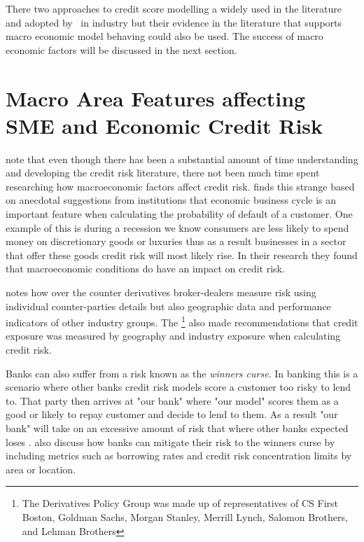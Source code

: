 There two approaches to credit score modelling a widely used in the literature and adopted by \subjectname\ in industry but their evidence in the literature that supports macro economic model behaving could also be used. The success of macro economic factors will be discussed in the next section.

\section{Macro Area Features affecting SME and Economic Credit Risk}
\cite{hackbarth_capital_2006} note that even though there has been a substantial amount of time  understanding and developing the credit risk literature, there not been much time spent researching how macroeconomic factors affect credit risk.  \cite{hackbarth_capital_2006} finds this strange based on anecdotal suggestions from institutions that economic business cycle is an important feature when calculating the probability of default of a customer. One example of this is during a recession we know consumers are less likely to spend money on discretionary goods or luxuries thus as a result businesses in a sector that offer these goods credit risk will most likely rise. In their research they found that macroeconomic conditions do have an impact on credit risk.

\cite{fama_term_1986} notes how over the counter derivatives broker-dealers measure risk using individual counter-parties details but also geographic data and performance indicators of other industry groups. The \cite{derivatives_policy_group_framework_1995} \footnote{The Derivatives Policy Group was made up of representatives of CS First Boston, Goldman Sachs, Morgan Stanley, Merrill Lynch, Salomon Brothers, and Lehman Brothers} also made recommendations that credit exposure was measured by geography and industry exposure when calculating credit risk.

Banks can also suffer from a risk known as the \textit{winners curse}. In banking this is a scenario where other banks credit risk models score a customer too risky to lend to. That party then arrives at "our bank" where "our model" scores them as a good or likely to repay customer and decide to lend to them. As a result "our bank" will take on an excessive amount of risk that where other banks expected loses \citep{duffie_credit_2012}. \cite{duffie_credit_2012} also discuss how banks can mitigate their risk to the winners curse by including metrics such as borrowing rates and credit risk concentration limits by area or location.

